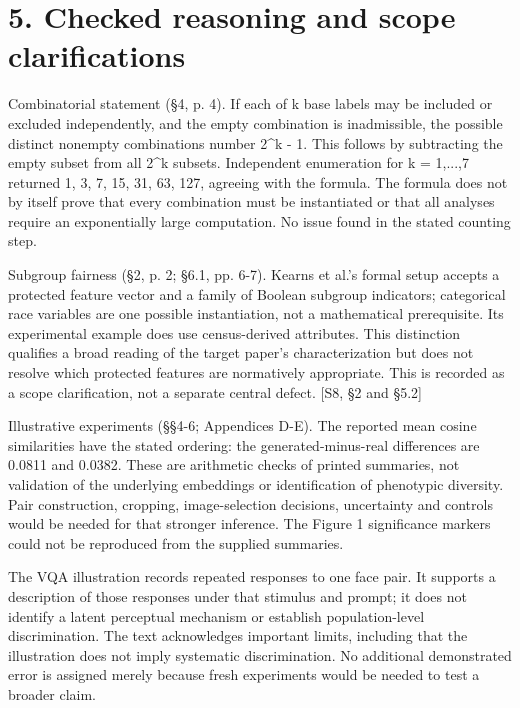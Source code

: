 \documentclass[10pt]{article}
\begin{document}
\section*{5. Checked reasoning and scope clarifications}
Combinatorial statement (§4, p. 4). If each of k base labels may be included or excluded independently, and the empty combination is inadmissible, the possible distinct nonempty combinations number 2\textasciicircum{}k - 1. This follows by subtracting the empty subset from all 2\textasciicircum{}k subsets. Independent enumeration for k = 1,...,7 returned 1, 3, 7, 15, 31, 63, 127, agreeing with the formula. The formula does not by itself prove that every combination must be instantiated or that all analyses require an exponentially large computation. No issue found in the stated counting step.\par
Subgroup fairness (§2, p. 2; §6.1, pp. 6-7). Kearns et al.’s formal setup accepts a protected feature vector and a family of Boolean subgroup indicators; categorical race variables are one possible instantiation, not a mathematical prerequisite. Its experimental example does use census-derived attributes. This distinction qualifies a broad reading of the target paper’s characterization but does not resolve which protected features are normatively appropriate. This is recorded as a scope clarification, not a separate central defect. [S8, §2 and §5.2]\par
Illustrative experiments (§§4-6; Appendices D-E). The reported mean cosine similarities have the stated ordering: the generated-minus-real differences are 0.0811 and 0.0382. These are arithmetic checks of printed summaries, not validation of the underlying embeddings or identification of phenotypic diversity. Pair construction, cropping, image-selection decisions, uncertainty and controls would be needed for that stronger inference. The Figure 1 significance markers could not be reproduced from the supplied summaries.\par
The VQA illustration records repeated responses to one face pair. It supports a description of those responses under that stimulus and prompt; it does not identify a latent perceptual mechanism or establish population-level discrimination. The text acknowledges important limits, including that the illustration does not imply systematic discrimination. No additional demonstrated error is assigned merely because fresh experiments would be needed to test a broader claim.\par
\end{document}
